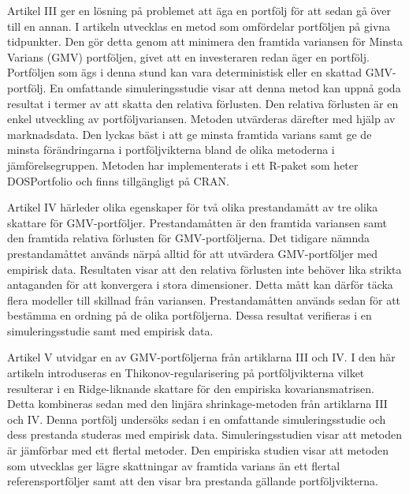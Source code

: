 Artikel III ger en lösning på problemet att äga en portfölj för att sedan gå över till en annan.
I artikeln utvecklas en metod som omfördelar portföljen på givna tidpunkter.
Den gör detta genom att minimera den framtida variansen för Minsta Varians (GMV) portföljen, givet att en investeraren redan äger en portfölj.
Portföljen som ägs i denna stund kan vara deterministisk eller en skattad GMV-portfölj.
En omfattande simuleringsstudie visar att denna metod kan uppnå goda resultat i termer av att skatta den relativa förlusten.
Den relativa förlusten är en enkel utveckling av portföljvariansen.
Metoden utvärderas därefter med hjälp av marknadsdata.
Den lyckas bäst i att ge minsta framtida varians samt ge de minsta förändringarna i portföljvikterna bland de olika metoderna i jämförelsegruppen.
Metoden har implementerats i ett R-paket som heter DOSPortfolio och finns tillgängligt på CRAN. 

Artikel IV härleder olika egenskaper för två olika prestandamått av tre olika skattare för GMV-portföljer.
Prestandamåtten är den framtida variansen samt den framtida relativa förlusten för GMV-portföljerna.
Det tidigare nämnda prestandamåttet används närpå alltid för att utvärdera GMV-portföljer med empirisk data.
Resultaten visar att den relativa förlusten inte behöver lika strikta antaganden för att konvergera i stora dimensioner.
Detta mått kan därför täcka flera modeller till skillnad från variansen.
Prestandamåtten används sedan för att bestämma en ordning på de olika portföljerna.
Dessa resultat verifieras i en simuleringsstudie samt med empirisk data. 

Artikel V utvidgar en av GMV-portföljerna från artiklarna III och IV.
I den här artikeln introduseras en Thikonov-regularisering på portföljvikterna vilket resulterar i en Ridge-liknande skattare för den empiriska kovariansmatrisen.
Detta kombineras sedan med den linjära shrinkage-metoden från artiklarna III och IV.
Denna portfölj undersöks sedan i en omfattande simuleringsstudie och dess prestanda studeras med empirisk data.
Simuleringsstudien visar att metoden är jämförbar med ett flertal metoder.
Den empiriska studien visar att metoden som utvecklas ger lägre skattningar av framtida varians än ett flertal referensportföljer samt att den visar bra prestanda gällande portföljvikterna.